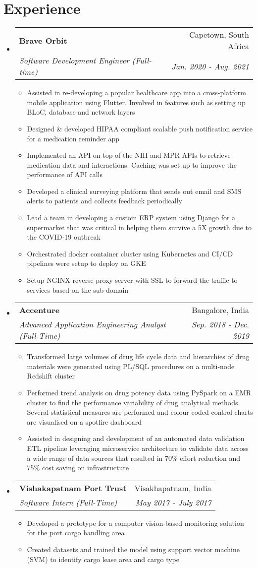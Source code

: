 \documentclass[letterpaper,10pt]{article}
\makeatletter
\newcommand{\resumeItemClean}[1]{
    \item\small{
        {#1 \vspace{-2pt}}
    }
}
\newcommand{\resumeSubheading}[4]{
  \vspace{-1pt}\item
    \begin{tabular*}{0.97\textwidth}[t]{l@{\extracolsep{\fill}}r}
      \textbf{#1} & #2 \\
      \textit{\small#3} & \textit{\small #4} \\
    \end{tabular*}\vspace{-5pt}
}
\newcommand{\resumeSubHeadingListStart}{\begin{itemize}[leftmargin=*]}
\newcommand{\resumeSubHeadingListEnd}{\end{itemize}}
\newcommand{\resumeItemListStart}{\begin{itemize}}
\newcommand{\resumeItemListEnd}{\end{itemize}\vspace{-5pt}}
\makeatother
\begin{document}
\section{Experience}
    \resumeSubHeadingListStart
    \resumeSubheading{Brave Orbit}{Capetown, South Africa}
        {Software Development Engineer (Full-time)}{Jan. 2020 - Aug. 2021}
            \resumeItemListStart
                \resumeItemClean
                    {Assisted in re-developing a popular healthcare app into a cross-platform mobile application using Flutter. Involved in features such as setting up BLoC, database and network layers}
                  \resumeItemClean
                    {Designed \& developed HIPAA compliant scalable push notification service for a medication reminder app}
                  \resumeItemClean
                    {Implemented an API on top of the NIH and MPR APIs to retrieve medication data and interactions. Caching was set up to improve the performance of API calls}
                  \resumeItemClean
                    {Developed a clinical surveying platform that sends out email and SMS alerts to patients and collects feedback periodically}
                  \resumeItemClean
                    {Lead a team in developing a custom ERP system using Django for a supermarket that was critical in helping them survive a 5X growth due to the COVID-19 outbreak}
                  \resumeItemClean
                    {Orchestrated docker container cluster using Kubernetes and CI/CD pipelines were setup to deploy on GKE}
                  \resumeItemClean
                    {Setup NGINX reverse proxy server with SSL to forward the traffic to services based on the sub-domain}
              \resumeItemListEnd
    \resumeSubheading
    	{Accenture}{Bangalore, India}
    	{Advanced Application Engineering Analyst (Full-Time)}{Sep. 2018 -  Dec. 2019}
    	    \resumeItemListStart
                \resumeItemClean
                  {Transformed large volumes of drug life cycle data and hierarchies of drug materials were generated using PL/SQL procedures on a multi-node Redshift cluster}
                \resumeItemClean
                  {Performed trend analysis on drug potency data using PySpark on a EMR cluster to find the performance variability of drug analytical methods. Several statistical measures are performed and colour coded control charts are visualised on a spotfire dashboard}
                \resumeItemClean
                  {Assisted in designing and development of an automated data validation ETL pipeline leveraging microservice architecture to validate data across a wide range of data sources that resulted in 70\% effort reduction and 75\% cost saving on infrastructure}
    	    \resumeItemListEnd
    \resumeSubheading
    	{Vishakapatnam Port Trust}{Visakhapatnam, India}
    	{Software Intern (Full-Time)}{May 2017 -  July 2017}
    	    \resumeItemListStart
            	\resumeItemClean
                  {Developed a prototype for a computer vision-based monitoring solution for the port cargo handling area}
                \resumeItemClean
                  {Created datasets and trained the model using support vector machine (SVM) to identify cargo lease area and cargo type}
    	    \resumeItemListEnd
    \resumeSubHeadingListEnd
\end{document}
